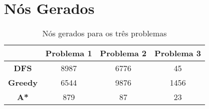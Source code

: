 \documentclass[12pt,a4paper]{article}
\begin{document}
\section{Nós Gerados}

\begin{table}[ht]
	\centering
	\begin{tabular}{c|c|c|c}
	\multicolumn{1}{r|}{} & \textbf{Problema 1} & \textbf{Problema 2} & \textbf{Problema 3} \\ \hline
	\textbf{DFS}          & 8987                                                                 & 6776                                                               & 45                                                             \\ \hline
	\textbf{Greedy}       & 6544                                                                 & 9876                                                               & 1456                                                           \\ \hline
	\textbf{A*}           & 879                                                                  & 87                                                                 & 23                                                            
	\end{tabular}
	\caption{Nós gerados para os três problemas}
	\label{ng}
\end{table}
\end{document}
